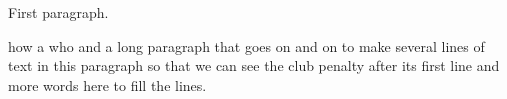 \documentclass{article}
\begin{document}
First paragraph.

{\color{red} how a who} and a long paragraph that goes on and on to make several lines of text in this paragraph so that we can see the club penalty after its first line and more words here to fill the lines.
\end{document}
